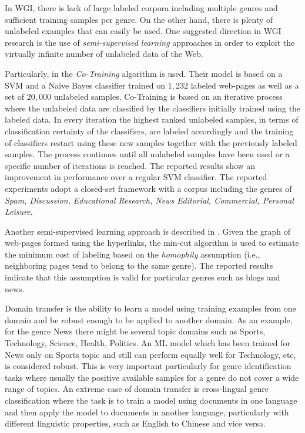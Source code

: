 In WGI, there is lack of large labeled corpora including multiple genres and sufficient training samples per genre. On the other hand, there is plenty of unlabeled examples that can easily be used. One suggested direction in WGI research is the use of \textit{semi-supervised learning} approaches in order to exploit the virtually infinite number of unlabeled data of the Web. 

Particularly, in \parencite{chetry2011web} the \textit{Co-Training} algorithm is used. Their model is based on a SVM and a Naive Bayes classifier trained on $1,232$ labeled web-pages as well as a set of $20,000$ unlabeled samples. Co-Training is based on an iterative process where the unlabeled data are classified by the classifiers initially trained using the labeled data. In every iteration the highest ranked unlabeled samples, in terms of classification certainty of the classifiers, are labeled accordingly and the training of classifiers restart using these new samples together with the previously labeled samples. The process continues until all unlabeled samples have been used or a specific number of iterations is reached. The reported results show an improvement in performance over a regular SVM classifier. The reported experiments adopt a closed-set framework with a corpus including the genres of \textit{Spam, Discussion, Educational Research, News Editorial, Commercial, Personal Leisure}.

Another semi-supervised learning approach is described in \parencite{asheghi2014semi}. Given the graph of web-pages formed using the hyperlinks, the min-cut algorithm is used to estimate the minimum cost of labeling based on the \textit{homophily} assumption (i.e., neighboring pages tend to belong to the same genre). The reported results indicate that this assumption is valid for particular genres such as blogs and news.

Domain transfer is the ability to learn a model using training examples from one domain and be robust enough to be applied to another domain. As an example, for the genre News there might be several topic domains such as Sports, Technology, Science, Health, Politics. An ML model which has been trained for News only on Sports topic and still can perform equally well for Technology, etc, is considered robust. This is very important particularly for genre identification tasks where usually the positive available samples for a genre do not cover a wide range of topics. An extreme case of domain transfer is cross-lingual genre classification where the task is to train a model using documents in one language and then apply the model to documents in another language, particularly with different linguistic properties, such as English to Chinese and vice versa.

